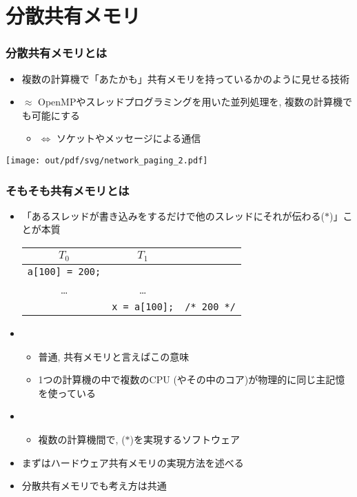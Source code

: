 \documentclass[12pt,dvipdfmx]{beamer}
\begin{document}
\section{分散共有メモリ}

\begin{frame}
  \frametitle{分散共有メモリとは}
  \begin{itemize}
  \item 複数の計算機で「あたかも」共有メモリを持っているかのように見せる技術
  \item $\approx$ OpenMPやスレッドプログラミングを用いた並列処理を, 複数の計算機でも可能にする
    \begin{itemize}
    \item $\Leftrightarrow$ ソケットやメッセージによる通信
    \end{itemize}
  \end{itemize}

  \begin{center}
    \texttt{[image: out/pdf/svg/network\_paging\_2.pdf]}      
  \end{center}
    
\end{frame}

\begin{frame}
  \frametitle{そもそも共有メモリとは}
  \begin{itemize}
  \item 「あるスレッドが書き込みをするだけで他のスレッドにそれが伝わる($\ast$)」ことが本質

    \begin{tabular}{c|cl}
      $T_0$               & $T_1$             & \\\hline
      {\tt a[100] = 200;} &                   & \\
      \ldots              & \ldots            & \\
                          & {\tt x = a[100];} & {\tt /* 200 */} \\
    \end{tabular}

    
  \item {}
    \begin{itemize}
    \item 普通, 共有メモリと言えばこの意味
    \item 1つの計算機の中で複数のCPU (やその中のコア)が物理的に同じ主記憶を使っている
    \end{itemize}
  \item {}
    \begin{itemize}
    \item 複数の計算機間で, ($\ast$)を実現するソフトウェア
    \end{itemize}
  \item まずはハードウェア共有メモリの実現方法を述べる
  \item 分散共有メモリでも考え方は共通
  \end{itemize}
\end{frame}
\end{document}
